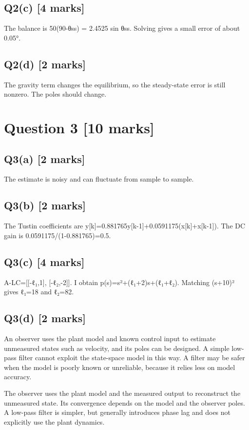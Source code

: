 \documentclass[11pt,a4paper]{article}
\begin{document}
\subsection*{Q2(c) \hfill [4 marks]}

The balance is 50(90-θss) = 2.4525 sin θss.
Solving gives a small error of about 0.05°.

\subsection*{Q2(d) \hfill [2 marks]}

The gravity term changes the equilibrium, so the steady-state error is still nonzero.
The poles should change.

\section*{Question 3 \hfill [10 marks]}
\subsection*{Q3(a) \hfill [2 marks]}

The estimate is noisy and can fluctuate from sample to sample.

\subsection*{Q3(b) \hfill [2 marks]}

The Tustin coefficients are y[k]=0.881765y[k-1]+0.0591175(x[k]+x[k-1]).
The DC gain is 0.0591175/(1-0.881765)=0.5.

\subsection*{Q3(c) \hfill [4 marks]}

A-LC=[[-ℓ₁,1], [-ℓ₂,-2]].
I obtain p(s)=s²+(ℓ₁+2)s+(ℓ₁+ℓ₂).
Matching (s+10)² gives ℓ₁=18 and ℓ₂=82.

\subsection*{Q3(d) \hfill [2 marks]}

An observer uses the plant model and known control input to estimate unmeasured states such as velocity, and its poles can be designed.
A simple low-pass filter cannot exploit the state-space model in this way.
A filter may be safer when the model is poorly known or unreliable, because it relies less on model accuracy.\par\smallskip The observer uses the plant model and the measured output to reconstruct the unmeasured state. Its convergence depends on the model and the observer poles. A low-pass filter is simpler, but generally introduces phase lag and does not explicitly use the plant dynamics.
\end{document}

